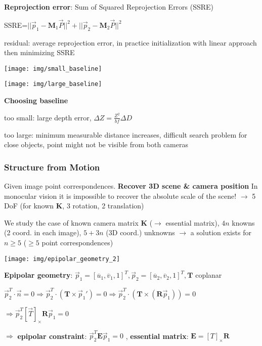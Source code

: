 \documentclass[fontsize=6pt]{scrartcl}
\newcommand{\mat}[1]{\mathbf{#1}}
\begin{document}
\begin{multicols*}{4}
\textbf{Reprojection error}: Sum of Squared Reprojection Errors (SSRE)

SSRE=$||\vec p_1 - \mat M_1\vec P||^2 + ||\vec p_2 - \mat M_2\vec P||^2$

residual: average reprojection error, in practice initialization with linear approach then minimizing SSRE

\begin{minipage}{0.16\linewidth}
	\texttt{[image: img/small\_baseline]}
\end{minipage}
\begin{minipage}{0.34\linewidth}
	\texttt{[image: img/large\_baseline]}
\end{minipage}
\begin{minipage}{0.5\linewidth}
\textbf{Choosing baseline}

too small: large depth error, $\Delta Z = \frac{Z^2}{bf} \Delta D$

too large: minimum measurable distance increases, difficult search problem for close objects, point might not be visible from both cameras
\end{minipage}

\subsubsection*{Structure from Motion}

Given image point correspondences. \textbf{Recover 3D scene \& camera position}
In monocular vision it is impossible to recover the absolute scale of the scene! $\rightarrow$ 5 DoF (for known $\mat K$, 3 rotation, 2 translation)

We study the case of known camera matrix $\mat K$ ($\rightarrow$ essential matrix), $4n$ knowns (2 coord. in each image), $5+3n$ (3D coord.) unknowns $\rightarrow$ a solution exists for $n\geq 5$ ($\geq 5$ point correspondences)

\texttt{[image: img/epipolar\_geometry\_2]}

\textbf{Epipolar geometry}: $\vec p_1 = [\overline{u}_1, \overline{v}_1, 1]^T, \vec p_2 = [\overline{u}_2, \overline{v}_2, 1]^T, \mat T$ coplanar

$\vec p_2^T \cdot \vec n = 0 \Rightarrow \vec p_2^T \cdot(\mat T \times \vec p_1')= 0 \Rightarrow \vec p_2^T \cdot (\mat T \times (\mat R \vec p_1)) = 0 $

$\Rightarrow \vec p_2^T[\vec T]_\times \mat R \vec p_1 = 0$ 

$\Rightarrow $ \textbf{epipolar constraint}: $\vec p_2^T \mat E \vec p_1 = 0 $ , \textbf{essential matrix}: $\mat E = [T]_\times \mat R$


\end{multicols*}
\end{document}
